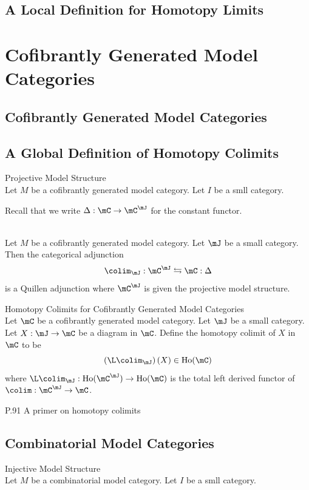 \documentclass[a4paper]{article}
\begin{document}
\subsection{A Local Definition for Homotopy Limits}

\pagebreak
\section{Cofibrantly Generated Model Categories}
\subsection{Cofibrantly Generated Model Categories}

\subsection{A Global Definition of Homotopy Colimits}
\begin{defn}{Projective Model Structure}{}\\ Let $M$ be a cofibrantly generated model category. Let $I$ be a smll category. 
\end{defn}

Recall that we write $\Delta:\mC\to\mC^\mJ$ for the constant functor. 

\begin{prp}{}{}\\ Let $M$ be a cofibrantly generated model category. Let $\mJ$ be a small category. Then the categorical adjunction $$\colim_\mJ:\mC^\mJ\leftrightarrows\mC:\Delta$$ is a Quillen adjunction where $\mC^\mJ$ is given the projective model structure. 
\end{prp}

\begin{defn}{Homotopy Colimits for Cofibrantly Generated Model Categories}{}\\ Let $\mC$ be a cofibrantly generated model category. Let $\mJ$ be a small category. Let $X:\mJ\to\mC$ be a diagram in $\mC$. Define the homotopy colimit of $X$ in $\mC$ to be $$\left(\L\colim_\mJ\right)(X)\in\text{Ho}(\mC)$$ where $\L\colim_\mJ:\text{Ho}(\mC^\mJ)\to\text{Ho}(\mC)$ is the total left derived functor of $\colim:\mC^\mJ\to\mC$. 
\end{defn}

P.91 A primer on homotopy colimits

\subsection{Combinatorial Model Categories}
\begin{defn}{Injective Model Structure}{}\\ Let $M$ be a combinatorial model category. Let $I$ be a smll category. 
\end{defn}
\end{document}
